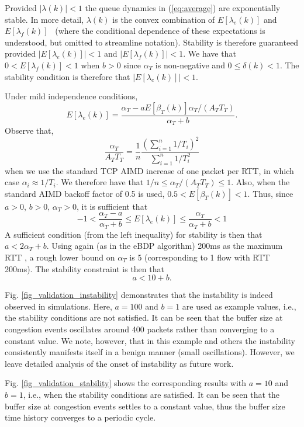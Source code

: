 \documentclass[10pt,twocolumn, journal]{IEEEtran}
\def\DLaddition#1{\noindent\ {\color{black} #1}}
\begin{document}
Provided  $|\lambda(k)|<1$ the queue dynamics in (\ref{eq:average}) are
exponentially stable.  In more detail, $\lambda(k)$ is the convex combination of
$E[\lambda_e(k)]$ and $E[\lambda_f(k)]$\DLaddition{(where the conditional dependence of these expectations is understood, but omitted to streamline notation)}.  Stability is therefore guaranteed provided
$|E[\lambda_e(k)]|<1$ and $|E[\lambda_f(k)]|<1$.  We have that $0<E[\lambda_f(k)] <1$
when $b>0$ since $\alpha_T$ is non-negative and $0 \leq \delta(k)<1$.   The stability
condition is therefore that $|E[\lambda_e(k)]|<1$.

Under mild independence conditions,
$$
E[\lambda_e(k)]=\frac{\alpha_T-aE[\beta_T(k)]\alpha_T/(A_TT_T)}{\alpha_T+b}.
$$
Observe that,
$$
\frac{\alpha_T}{A_TT_T} = \frac{1}{n}\frac{(\sum_{i=1}^n 1/T_i)^2}{\sum_{i=1}^n1/T_i^2}
$$
when we use the standard TCP AIMD increase of one packet per RTT, in which case $\alpha_i
\approx 1/T_i$.  We therefore have that $1/n\le \alpha_T /(A_T T_T)\le1$. Also, when the
standard AIMD backoff factor of 0.5 is used, $0.5<E[\beta_T(k)]<1$. Thus, since $a>0$,
$b>0$, $\alpha_T>0$, it is sufficient that
$$
-1 < \frac{\alpha_T-a}{\alpha_T+b}\le E[\lambda_e(k)]\le\frac{\alpha_T}{\alpha_T+b}<1
$$
A sufficient condition (from the left inequality) for stability is then that $a <
2\alpha_T+b$. Using again (as in the eBDP algorithm) 200ms as the maximum RTT , a rough
lower bound on $\alpha_T$ is 5 (corresponding to 1 flow with RTT 200ms).  The stability
constraint is then that
\begin{equation}\label{eq:acond}
    a < 10+b.
\end{equation}

Fig. \ref{fig_validation_instability} demonstrates that the instability is indeed
observed in simulations. Here, $a=100$ and $b=1$ are used as example values, i.e., the
stability conditions are not satisfied. It can be seen that the buffer size at congestion
events oscillates around 400 packets rather than converging to a constant value. We note,
however, that in this example and others the instability consistently manifests itself in
a benign manner (small oscillations).  However, we leave detailed analysis of the onset
of instability as future work.

Fig. \ref{fig_validation_stability} shows the corresponding results with $a=10$ and
$b=1$, i.e., when the stability conditions are satisfied. It can be seen that the buffer
size at congestion events settles to a constant value, thus the buffer size time history
converges to a periodic cycle.
\end{document}
